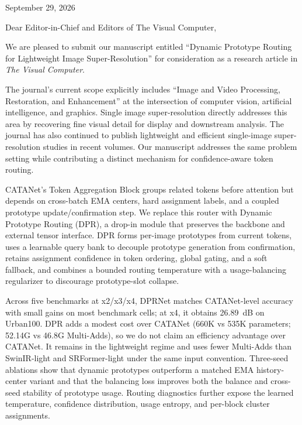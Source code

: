 \documentclass[10pt]{article}
\begin{document}
\begin{flushright}
September 29, 2026
\end{flushright}

\noindent Dear Editor-in-Chief and Editors of The Visual Computer,

\medskip
\noindent We are pleased to submit our manuscript entitled ``Dynamic Prototype Routing for
Lightweight Image Super-Resolution'' for consideration as a research article in
\emph{The Visual Computer}.

The journal's current scope explicitly includes ``Image and Video Processing,
Restoration, and Enhancement'' at the intersection of computer vision, artificial
intelligence, and graphics. Single image super-resolution directly addresses this area by
recovering fine visual detail for display and downstream analysis. The journal has also
continued to publish lightweight and efficient single-image super-resolution studies in
recent volumes. Our manuscript addresses the same problem setting while contributing a
distinct mechanism for confidence-aware token routing.

CATANet's Token Aggregation Block groups related tokens before attention but depends on
cross-batch EMA centers, hard assignment labels, and a coupled prototype
update/confirmation step. We replace this router with Dynamic Prototype Routing (DPR), a
drop-in module that preserves the backbone and external tensor interface. DPR forms
per-image prototypes from current tokens, uses a learnable query bank to decouple prototype
generation from confirmation, retains assignment confidence in token ordering, global
gating, and a soft fallback, and combines a bounded routing temperature with a
usage-balancing regularizer to discourage prototype-slot collapse.

Across five benchmarks at x2/x3/x4, DPRNet matches CATANet-level accuracy with small gains
on most benchmark cells; at x4, it obtains 26.89~dB on Urban100. DPR adds a modest cost over
CATANet (660K vs 535K parameters; 52.14G vs 46.8G Multi-Adds), so we do not claim an
efficiency advantage over CATANet. It remains in the lightweight regime and uses fewer
Multi-Adds than SwinIR-light and SRFormer-light under the same input convention. Three-seed
ablations show that dynamic prototypes outperform a matched EMA history-center variant and
that the balancing loss improves both the balance and cross-seed stability of prototype
usage. Routing diagnostics further expose the learned temperature, confidence distribution,
usage entropy, and per-block cluster assignments.
\end{document}
